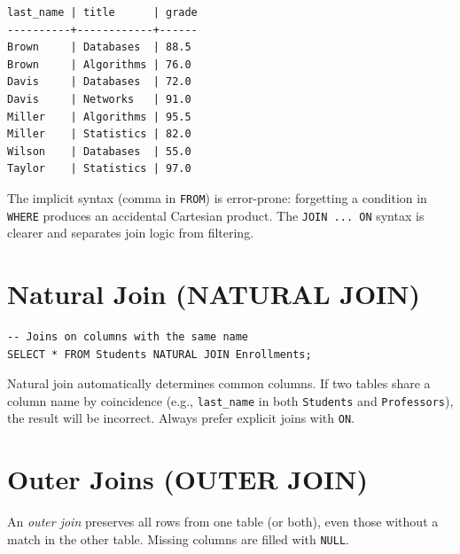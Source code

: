 \begin{codeoutput}
\begin{verbatim}
last_name | title      | grade
----------+------------+------
Brown     | Databases  | 88.5
Brown     | Algorithms | 76.0
Davis     | Databases  | 72.0
Davis     | Networks   | 91.0
Miller    | Algorithms | 95.5
Miller    | Statistics | 82.0
Wilson    | Databases  | 55.0
Taylor    | Statistics | 97.0
\end{verbatim}
\end{codeoutput}

\begin{bestpractice}[title=\textbf{Always Use Explicit JOIN Syntax}]
The implicit syntax (comma in \texttt{FROM}) is error-prone: forgetting a
condition in \texttt{WHERE} produces an accidental Cartesian product.
The \texttt{JOIN ... ON} syntax is clearer and separates join logic from filtering.
\end{bestpractice}

\section{Natural Join (NATURAL JOIN)}

\begin{codeblock}[title=\textbf{Natural Join}]
\begin{verbatim}
-- Joins on columns with the same name
SELECT * FROM Students NATURAL JOIN Enrollments;
\end{verbatim}
\end{codeblock}

\begin{warning}[title=\textbf{Danger of NATURAL JOIN}]
Natural join automatically determines common columns. If two tables share a
column name by coincidence (e.g., \texttt{last\_name} in both \texttt{Students}
and \texttt{Professors}), the result will be incorrect. Always prefer explicit
joins with \texttt{ON}.
\end{warning}

\section{Outer Joins (OUTER JOIN)}

\begin{definition}
An \emph{outer join} preserves all rows from one table (or both), even those
without a match in the other table. Missing columns are filled with \texttt{NULL}.
\end{definition}

